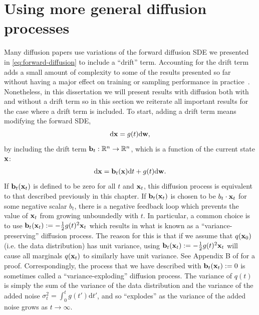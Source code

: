 \section{Using more general diffusion processes}
Many diffusion papers use variations of the forward diffusion SDE we presented in \cref{eq:forward-diffusion} to include a ``drift'' term. Accounting for the drift term adds a small amount of complexity to some of the results presented so far without having a major effect on training or sampling performance in practice~\citep{karras2022elucidating}. Nonetheless, in this dissertation we will present results with diffusion both with and without a drift term so in this section we reiterate all important results for the case where a drift term is included. To start, adding a drift term means modifying the forward SDE,
\begin{equation}
    \mathrm{d}{\mathbf{x}} = g(t) \mathrm{d}{\mathbf{w}},
\end{equation}
by including the drift term ${\mathbf{b}}_t: \mathbb{R}^n \rightarrow \mathbb{R}^n$, which is a function of the current state ${\mathbf{x}}$:
\begin{align} \label{eq:forward-diffusion-with-drift}
    \mathrm{d}{\mathbf{x}} = {\mathbf{b}}_t({\mathbf{x}}) \mathrm{d}t + g(t) \mathrm{d}{\mathbf{w}}.
\end{align}
If ${\mathbf{b}}_t({\mathbf{x}}_t)$ is defined to be zero for all $t$ and ${\mathbf{x}}_t$, this diffusion process is equivalent to that described previously in this chapter. If ${\mathbf{b}}_t({\mathbf{x}}_t)$ is chosen to be $b_t \cdot {\mathbf{x}}_t$ for some negative scalar $b_t$, there is a negative feedback loop which prevents the value of ${\mathbf{x}}_t$ from growing unboundedly with $t$. In particular, a common choice is to use ${\mathbf{b}}_t({\mathbf{x}}_t) := - \frac{1}{2}g(t)^2{\mathbf{x}}_t$ which results in what is known as a ``variance-preserving'' diffusion process. The reason for this is that if we assume that $q({\mathbf{x}}_0)$ (i.e. the data distribution) has unit variance, using ${\mathbf{b}}_t({\mathbf{x}}_t) := - \frac{1}{2}g(t)^2{\mathbf{x}}_t$ will cause all marginals $q({\mathbf{x}}_t)$ to similarly have unit variance. See Appendix B of \citet{song2020score} for a proof. Correspondingly, the process that we have described with ${\mathbf{b}}_t({\mathbf{x}}_t) := 0$ is sometimes called a ``variance-exploding'' diffusion process. The variance of $q(t)$ is simply the sum of the variance of the data distribution and the variance of the added noise $\sigma_t^2 = \int_0^t g(t') \mathrm{d}t'$, and so ``explodes'' as the variance of the added noise grows as $t \rightarrow \infty$.


